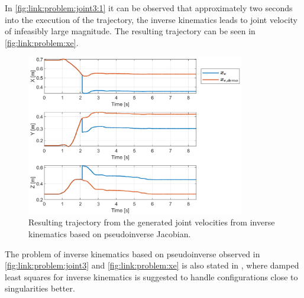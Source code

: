 \documentclass[../main.tex]{subfiles}
\begin{document}
In \autoref{fig:link:problem:joint3:1} it can be observed that approximately two seconds into the execution of the trajectory, the inverse kinematics leads to joint velocity of infeasibly large magnitude. The resulting trajectory can be seen in \autoref{fig:link:problem:xe}.
\begin{figure}[H]
    \centering
         \includegraphics[width=0.85\textwidth]{figures/linkcollision/inversekin_prob_xe.png}
     \caption{Resulting trajectory from the generated joint velocities from inverse kinematics based on pseudoinverse Jacobian.}
     \label{fig:link:problem:xe}
\end{figure}
The problem of inverse kinematics based on pseudoinverse observed in \autoref{fig:link:problem:joint3} and \autoref{fig:link:problem:xe} is also stated in \cite{buss_introduction_nodate}, where damped least squares for inverse kinematics is suggested to handle configurations close to singularities better.
\end{document}
